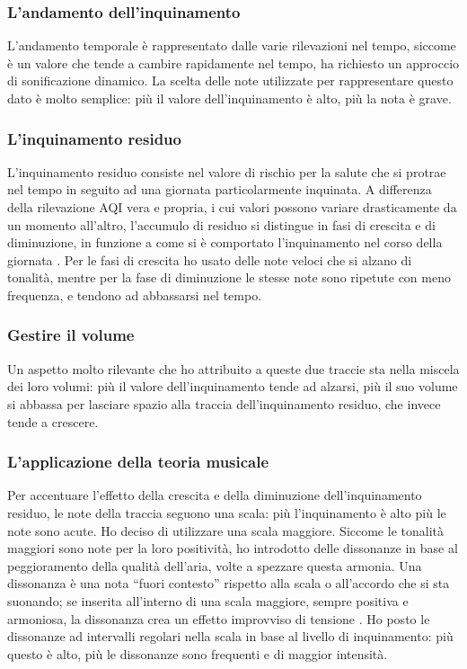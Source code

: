 \subsubsection{L'andamento dell'inquinamento}
L'andamento temporale è rappresentato dalle varie rilevazioni nel tempo, siccome è un valore che tende a cambire rapidamente nel tempo, ha richiesto un approccio di sonificazione dinamico.
La scelta delle note utilizzate per rappresentare questo dato è molto semplice: più il valore dell'inquinamento è alto, più la nota è grave.
\subsubsection{L'inquinamento residuo}
L'inquinamento residuo consiste nel valore di rischio per la salute che si protrae nel tempo in seguito ad una giornata particolarmente inquinata.
A differenza della rilevazione AQI vera e propria, i cui valori possono variare drasticamente da un momento all'altro, l'accumulo di residuo si distingue in fasi di crescita e di diminuzione, in funzione a come si è comportato l'inquinamento nel corso della giornata \cite{residue}.
Per le fasi di crescita ho usato delle note veloci che si alzano di tonalità, mentre per la fase di diminuzione le stesse note sono ripetute con meno frequenza, e tendono ad abbassarsi nel tempo.
\subsubsection{Gestire il volume}
Un aspetto molto rilevante che ho attribuito a queste due traccie sta nella miscela dei loro volumi: più il valore dell'inquinamento tende ad alzarsi, più il suo volume si abbassa per lasciare spazio alla traccia dell'inquinamento residuo, che invece tende a crescere.
\subsubsection{L'applicazione della teoria musicale}
Per accentuare l'effetto della crescita e della diminuzione dell'inquinamento residuo, le note della traccia seguono una scala: più l'inquinamento è alto più le note sono acute.
Ho deciso di utilizzare una scala maggiore. Siccome le tonalità maggiori sono note per la loro positività, ho introdotto delle dissonanze in base al peggioramento della qualità dell'aria, volte a spezzare questa armonia.
Una dissonanza è una nota “fuori contesto” rispetto alla scala o all'accordo che si sta suonando; se inserita all'interno di una scala maggiore, sempre positiva e armoniosa, la dissonanza crea un effetto improvviso di tensione \cite{dissonance}.
Ho posto le dissonanze ad intervalli regolari nella scala in base al livello di inquinamento: più questo è alto, più le dissonanze sono frequenti e di maggior intensità.


